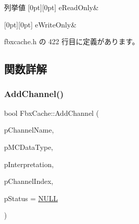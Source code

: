\begin{DoxyEnumFields}{列挙値}
[0pt][0pt]{}\mbox{\label{class_fbx_cache_a92f455159736ec2cdc0c282af9dbd139acfeade2d8bab8a3b915f8064991cc007}} 
e\+Read\+Only&\\
\hline

[0pt][0pt]{}\mbox{\label{class_fbx_cache_a92f455159736ec2cdc0c282af9dbd139af48325666196336ed9c672386686ef63}} 
e\+Write\+Only&\\
\hline

\end{DoxyEnumFields}


 fbxcache.\+h の 422 行目に定義があります。



\subsection{関数詳解}
\mbox{\label{class_fbx_cache_a5cc3311b704a1405aae637cd8a30e1c8}} 
\subsubsection{\texorpdfstring{Add\+Channel()}{AddChannel()}}
{\footnotesize\ttfamily bool Fbx\+Cache\+::\+Add\+Channel (\begin{DoxyParamCaption}\item[{const char $\ast$}]{p\+Channel\+Name,  }\item[{\hyperlink{class_fbx_cache_a80f82fa5f485ff6c46565ffb151998b3}{E\+M\+C\+Data\+Type}}]{p\+M\+C\+Data\+Type,  }\item[{const char $\ast$}]{p\+Interpretation,  }\item[{unsigned int \&}]{p\+Channel\+Index,  }\item[{\hyperlink{class_fbx_status}{Fbx\+Status} $\ast$}]{p\+Status = {\ttfamily \hyperlink{fbxarch_8h_a070d2ce7b6bb7e5c05602aa8c308d0c4}{N\+U\+LL}} }\end{DoxyParamCaption})}

